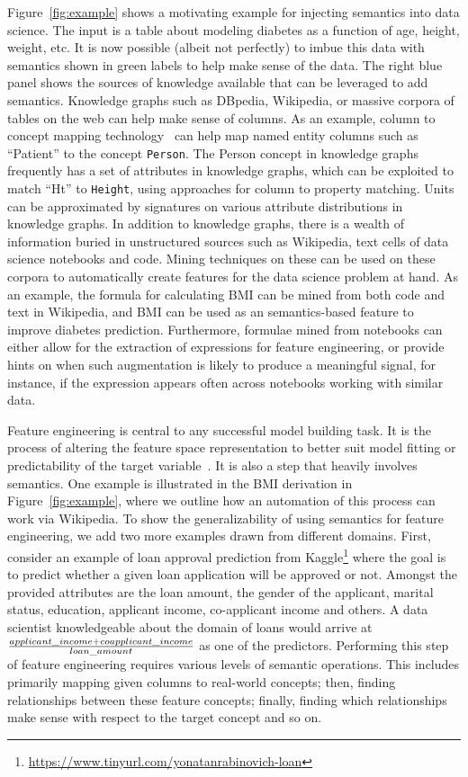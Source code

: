 \documentclass[sigconf]{acmart}
\begin{document}
Figure~\ref{fig:example} shows a motivating example for injecting semantics into data science.  The input is a table about modeling diabetes as a function of age, height, weight, etc.  It is now possible (albeit not perfectly) to imbue this data with semantics shown in green labels to help make sense of the data. The right blue panel shows the sources of knowledge available that can be leveraged to add semantics.  Knowledge graphs such as DBpedia, Wikipedia, or massive corpora of tables on the web can help make sense of columns.  As an example, column to concept mapping technology~\cite{khurana2020semantic} can help map named entity columns such as ``Patient'' to the concept \texttt{Person}.  The Person concept in knowledge graphs frequently has a set of attributes in knowledge graphs, which can be exploited to match ``Ht'' to \texttt{Height}, using approaches for column to property matching.  Units can be approximated by signatures on various attribute distributions in knowledge graphs.  In addition to knowledge graphs, there is a wealth of information buried in unstructured sources such as Wikipedia, text cells of data science notebooks and code. Mining techniques on these can be used on these corpora to automatically create features for the data science problem at hand.  As an example, the formula for calculating BMI can be mined from both code and text in Wikipedia, and BMI can be used as an semantics-based feature to improve diabetes prediction.  Furthermore, formulae mined from notebooks can either allow for the extraction of expressions for feature engineering, or provide hints on when such augmentation is likely to produce a meaningful signal, for instance, if the expression appears often across notebooks working with similar data. 

Feature engineering is central to any successful model building task. It is the process of altering the feature space representation to better suit model fitting or predictability of the target variable~\cite{fechapter}. It is also a step that heavily involves semantics. One example is illustrated in the BMI derivation in Figure~\ref{fig:example}, where we outline how an automation of this process can work via Wikipedia.  To show the generalizability of using semantics for feature engineering, we add two more examples drawn from different domains.  First, consider an example of loan approval prediction from Kaggle\footnote{\url{https://www.tinyurl.com/yonatanrabinovich-loan}}%
where the goal is to predict whether a given loan application will be approved or not. Amongst the provided attributes are the loan amount, the gender of the applicant, marital status, education, applicant income, co-applicant income and others. A data scientist knowledgeable about the domain of loans would arrive at ${applicant\_income + coapplicant\_income} \over {loan\_amount}$ as one of the predictors. Performing this step of feature engineering requires various levels of semantic operations. This includes primarily mapping given columns to real-world concepts; then, finding relationships between these feature concepts; finally, finding which relationships make sense with respect to the target concept and so on.
\end{document}
